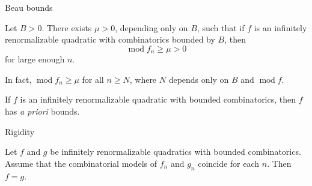 \documentclass{beamer}
\DeclareMathOperator{\modulus}{mod}
\begin{document}
\begin{frame}{Beau bounds}

\pause

\begin{theorem}
Let $B>0$. There exists $\mu>0$, depending only on $B$, such that if $f$ is an infinitely renormalizable quadratic with combinatorics bounded by $B$, then \[\modulus f_n\geq \mu>0\] for large enough $n$.
\end{theorem}
In fact, $\modulus f_n\geq\mu$ for all $n\geq N$, where $N$ depends only on $B$ and $\modulus f$.
\begin{theorem}
If $f$ is an infinitely renormalizable quadratic with bounded combinatorics, then $f$ has \textit{a priori} bounds.
\end{theorem}
\end{frame}

\begin{frame}{Rigidity}
\begin{theorem}[Rigidity]
Let $f$ and $g$ be infinitely renormalizable quadratics with bounded combinatorics. Assume that the combinatorial models of $f_n$ and $g_n$ coincide for each $n$. Then $f=g$.
\end{theorem}
\end{frame}
\end{document}
